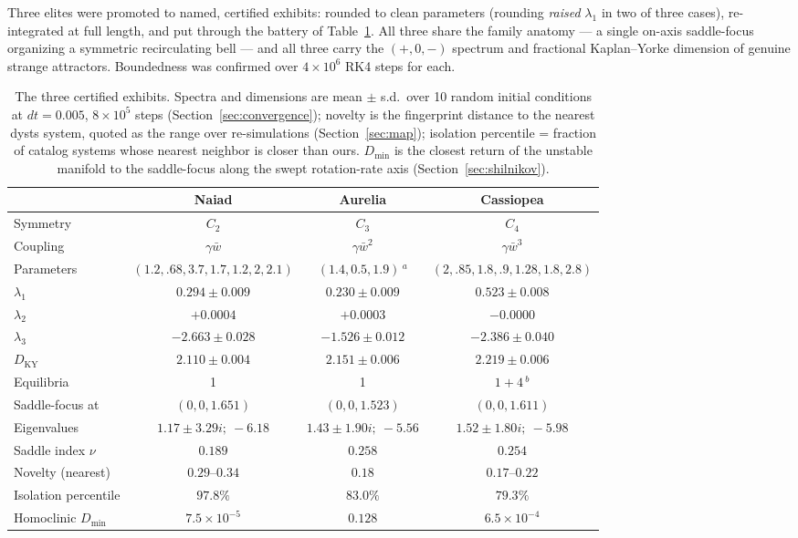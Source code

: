 \documentclass[11pt]{article}
\newcommand{\dky}{D_{\mathrm{KY}}}
\newcommand{\conj}[1]{\bar{#1}}
\begin{document}
Three elites were promoted to named, certified exhibits: rounded to clean
parameters (rounding \emph{raised} $\lambda_1$ in two of three cases),
re-integrated at full length, and put through the battery of
Table~\ref{tab:systems}. All three share the family anatomy --- a single
on-axis saddle-focus organizing a symmetric recirculating bell --- and all
three carry the $(+,0,-)$ spectrum and fractional Kaplan--Yorke dimension
\citep{kaplanYorke1979} of genuine strange attractors. Boundedness was
confirmed over $4\times10^6$ RK4 steps for each.

\begin{table}[tbp]
  \centering\small
  \caption{The three certified exhibits. Spectra and dimensions are
  mean $\pm$ s.d.\ over 10 random initial conditions at $dt=0.005$,
  $8\times10^5$ steps (Section~\ref{sec:convergence}); novelty is the
  fingerprint distance to the nearest \textsf{dysts} system, quoted as the
  range over re-simulations (Section~\ref{sec:map}); isolation percentile
  = fraction of catalog systems whose nearest neighbor is closer than
  ours. $D_{\min}$ is the closest return of the unstable manifold to the
  saddle-focus along the swept rotation-rate axis
  (Section~\ref{sec:shilnikov}).}
  \label{tab:systems}
  \begin{tabular}{@{}lccc@{}}
    \toprule
    & Naiad & Aurelia & Cassiopea \\
    \midrule
    Symmetry & $C_2$ & $C_3$ & $C_4$ \\
    Coupling & $\gamma\conj{w}$ & $\gamma\conj{w}^{2}$ & $\gamma\conj{w}^{3}$ \\
    Parameters & $(1.2,.68,3.7,1.7,1.2,2,2.1)$ & $(1.4,0.5,1.9)$\,$^{a}$ & $(2,.85,1.8,.9,1.28,1.8,2.8)$ \\
    $\lambda_1$ & $0.294 \pm 0.009$ & $0.230 \pm 0.009$ & $0.523 \pm 0.008$ \\
    $\lambda_2$ & $+0.0004$ & $+0.0003$ & $-0.0000$ \\
    $\lambda_3$ & $-2.663 \pm 0.028$ & $-1.526 \pm 0.012$ & $-2.386 \pm 0.040$ \\
    $\dky$ & $2.110 \pm 0.004$ & $2.151 \pm 0.006$ & $2.219 \pm 0.006$ \\
    Equilibria & 1 & 1 & $1 + 4$\,$^{b}$ \\
    Saddle-focus at & $(0,0,1.651)$ & $(0,0,1.523)$ & $(0,0,1.611)$ \\
    Eigenvalues & $1.17 \pm 3.29i;\ -6.18$ & $1.43 \pm 1.90i;\ -5.56$ & $1.52 \pm 1.80i;\ -5.98$ \\
    Saddle index $\nu$ & $0.189$ & $0.258$ & $0.254$ \\
    Novelty (nearest) & $0.29$--$0.34$ & $0.18$ & $0.17$--$0.22$ \\
    Isolation percentile & $97.8\%$ & $83.0\%$ & $79.3\%$ \\
    Homoclinic $D_{\min}$ & $7.5\times10^{-5}$ & $0.128$ & $6.5\times10^{-4}$ \\
    \bottomrule
  \end{tabular}


\end{table}
\end{document}
